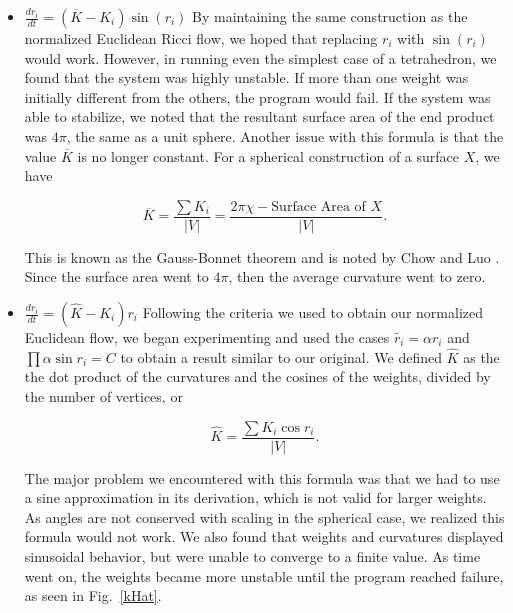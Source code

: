 \documentclass[12pt]{article}
\begin{document}
\begin{itemize}
\item $\displaystyle \frac{dr_i}{dt} = (\overline{K} - K_i)\sin(r_i)$ 
 By maintaining the same construction as the normalized Euclidean Ricci flow, we hoped that replacing $r_i$ with $\sin(r_i)$ would work. However, in running even the simplest case of a tetrahedron, we found that the system was highly unstable. If more than one weight was initially different from the others, the program would fail. If the system was able to stabilize, we noted that the resultant surface area of the end product was $4\pi$, the same as a unit sphere. Another issue with this formula is that the value $\overline{K}$ is no longer constant. For a spherical construction of a surface $X$, we have 

$$\overline{K} = \frac{\sum{K_i}}{|V|} = \frac{2\pi\chi - \mbox{Surface Area of }X}{|V|}.$$

 This is known as the Gauss-Bonnet theorem and is noted by Chow and Luo \cite{chowluo}. Since the surface area went to $4\pi$, then the average curvature went to zero. 

\item $\displaystyle \frac{dr_i}{dt} = (\hat{K} - K_i)r_i$ 
 Following the criteria we used to obtain our normalized Euclidean flow, we began experimenting and used the cases $\tilde{r_i} = \alpha r_i$ and $\prod{\alpha \sin r_i} = C$ to obtain a result similar to our original. We defined $\hat{K}$ as the the dot product of the curvatures and the cosines of the weights, divided by the number of vertices, or 

$$\hat{K} = \frac{\sum{K_i \cos r_i}}{|V|}.$$

 The major problem we encountered with this formula was that we had to use a sine approximation in its derivation, which is not valid for larger weights. As angles are not conserved with scaling in the spherical case, we realized this formula would not work. We also found that weights and curvatures displayed sinusoidal behavior, but were unable to converge to a finite value. As time went on, the weights became more unstable until the program reached failure, as seen in Fig.~\ref{kHat}.


\end{itemize}
\end{document}
